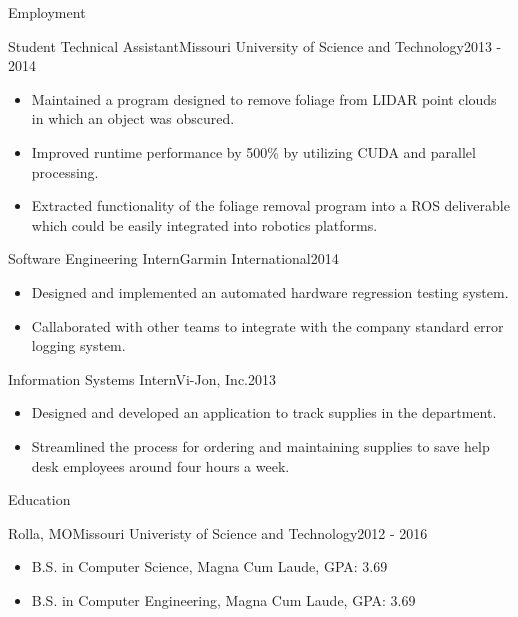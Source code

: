 \documentclass[]{mcdowellcv}
\begin{document}
\begin{cvsection}{Employment}
        \begin{cvsubsection}[2]{Student Technical Assistant}{Missouri University of Science and Technology}{2013 - 2014}		
			\begin{itemize}
                \item Maintained a program designed to remove foliage from LIDAR point clouds in which an object was obscured.
                \item Improved runtime performance by 500\% by utilizing CUDA and parallel processing.
                \item Extracted functionality of the foliage removal program into a ROS deliverable which could be easily integrated into robotics platforms.
			\end{itemize}
		\end{cvsubsection}
		
        \begin{cvsubsection}{Software Engineering Intern}{Garmin International}{2014}	
			\begin{itemize}
			    \item Designed and implemented an automated hardware regression testing system.
                \item Callaborated with other teams to integrate with the company standard error logging system.
			\end{itemize}
		\end{cvsubsection}

        \begin{cvsubsection}{Information Systems Intern}{Vi-Jon, Inc.}{2013}
            \begin{itemize}
                \item Designed and developed an application to track supplies in the department.
                \item Streamlined the process for ordering and maintaining supplies to save help desk employees around four hours a week.
            \end{itemize}
        \end{cvsubsection}
	\end{cvsection}
	
	\begin{cvsection}{Education}
        \begin{cvsubsection}[2]{Rolla, MO}{Missouri Univeristy of Science and Technology}{2012 - 2016}
			\begin{itemize}
				\item B.S. in Computer Science, Magna Cum Laude, GPA: 3.69
                \item B.S. in Computer Engineering, Magna Cum Laude, GPA: 3.69
			\end{itemize}
		\end{cvsubsection}
	\end{cvsection}	
	
\end{document}
